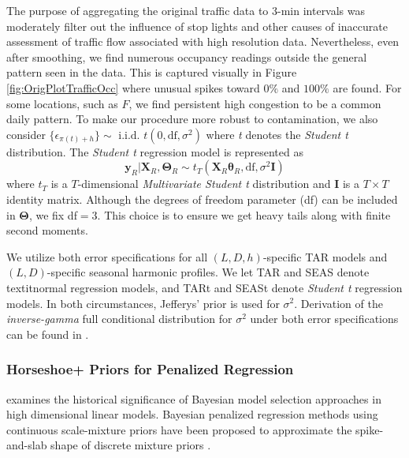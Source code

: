 The purpose of aggregating the original traffic data to 3-min intervals was moderately filter out the influence of stop lights and other causes of inaccurate assessment of traffic flow associated with high resolution data. Nevertheless, even after smoothing, we find numerous occupancy readings outside the general pattern seen in the data. This is captured visually in Figure \ref{fig:OrigPlotTrafficOcc} where unusual spikes toward $0\%$ and $100\%$ are found. For some locations, such as $F$, we find persistent high congestion to be a common daily pattern. To make our procedure more robust to contamination, we also consider  $\{\epsilon_{\pi(t)+h}\} \sim \textrm{ i.i.d. } t(0,\textrm{df},\sigma^2)$ where \textit{t} denotes the \textit{Student t} distribution. The \textit{Student t} regression model is represented as 
\begin{equation}
\label{eq:tmod}
\bm{y}_R|\bm{X}_R,\bm{\Theta}_R\sim t_T(\bm{X}_R\bm{\theta}_R,\textrm{df},\sigma^2\bm{I})
\end{equation}
where $t_T$ is a $T$-dimensional \textit{Multivariate Student t} distribution and $\bm{I}$ is a $T\times T$ identity matrix. Although the degrees of freedom parameter (df) can be included in $\bm{\Theta}$, we fix df$=3$. This choice is to ensure we get heavy tails along with finite second moments.

We utilize both error specifications for all $(L,D,h)$-specific TAR models and $(L,D)$-specific seasonal harmonic profiles. We let TAR and SEAS denote textit{normal} regression models, and TARt and SEASt denote \textit{Student t} regression models. In both circumstances, Jefferys' prior is used for $\sigma^2$. Derivation of the \textit{inverse-gamma} full conditional distribution for $\sigma^2$ under both error specifications can be found in \cite{bayesreg}.

\subsubsection{Horseshoe+ Priors for Penalized Regression}

\cite{Mallick2013} examines the historical significance of Bayesian model selection approaches in high dimensional linear models. Bayesian penalized regression methods using continuous scale-mixture priors \citep{OHara2009,Polson2010} have been proposed to approximate the spike-and-slab shape of discrete mixture priors \citep{Mitchell1988,George1993,Madigan1994,Carlin1995,Kuo1998,Ishwaran2005,Ishwaran2011}.

